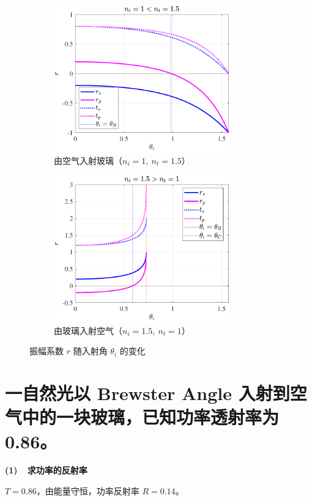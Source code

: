 \documentclass[UTF8]{report}
\theoremstyle{MyLineTheoremStyle} %
\theoremstyle{MyBlockTheoremStyle} %
\theoremstyle{MySubsubsectionStyle} %
\begin{document}
\begin{figure}[H]\centering
\begin{subfigure}[t]{0.49\textwidth}\centering
    \includegraphics[height=180pt]{assets/2/2024-09-15_10-53-31.pdf}
    \caption{ 由空气入射玻璃（$n_i = 1,\ n_t = 1.5$） }
\end{subfigure}
\begin{subfigure}[t]{0.49\textwidth}\centering
    \includegraphics[height=180pt]{assets/2/2024-09-15_10-53-27.pdf}
    \caption{ 由玻璃入射空气（$n_i = 1.5,\ n_t = 1$） }
\end{subfigure}
\caption{ 振幅系数 $r$ 随入射角 $\theta_i$ 的变化 }\label{振幅系数随入射角的变化}
\end{figure}

\vspace{-7mm}
\section{一自然光以 Brewster Angle 入射到空气中的一块玻璃，已知功率透射率为 0.86。}


\textbf{(1)\ \ 求功率的反射率}

$T = 0.86$，由能量守恒，功率反射率 $R = 0.14$。
\end{document}
